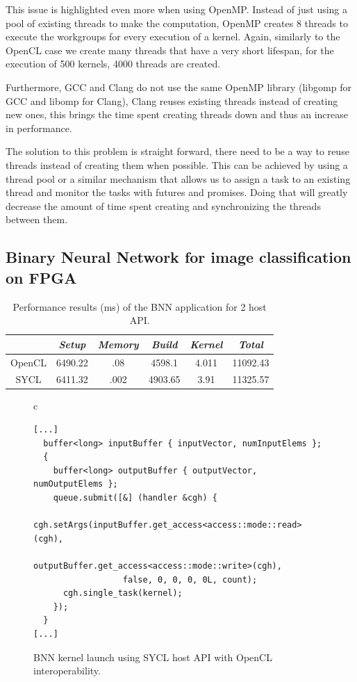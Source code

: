 \documentclass[sigplan, review, authordraft]{acmart}
\begin{document}
This issue is highlighted even more when using OpenMP. Instead of just using
a pool of existing threads to make the computation, OpenMP creates 8 threads
to execute the workgroups for every execution of a kernel. Again, similarly to
the OpenCL case we create many threads that have a very short lifespan,
for the execution of 500 kernels, 4000 threads are created.

Furthermore, GCC and Clang do not use the same OpenMP library (libgomp for GCC 
and libomp for Clang), Clang reuses existing threads instead of creating new 
ones, this brings the time spent creating threads down and thus an increase
in performance.

The solution to this problem is straight forward, there need to be a way to
reuse threads instead of creating them when possible. This can be achieved
by using a thread pool or a similar mechanism that allows us to assign a task
to an existing thread and monitor the tasks with futures and promises.
Doing that will greatly decrease the amount of time spent creating and
synchronizing the threads between them.


\subsection{Binary Neural Network for image classification on FPGA}
\label{sec:example-from-ken}

\begin{table}
  \caption{Performance results (ms) of the BNN application for 2 host
    API.}
  \begin{tabular}{|c|c|c|c|c|c|}
    \cline{2-6}
    \multicolumn{1}{c|}{}&   \textit{Setup}      & \textit{Memory} & \textit{Build}  & \textit{Kernel} & \textit{Total} \\\hline
    OpenCL& 6490.22     &     .08& 4598.1   & 4.011 &11092.43 \\\hline
    SYCL  & 6411.32     & .002   & 4903.65  & 3.91  &11325.57 \\\hline
  \end{tabular}
  \label{tbl:perfbnn}
\end{table}

\begin{figure}
  \begin{tabular}{c}
    \begin{lstlisting}[basicstyle=\scriptsize]
[...]
  buffer<long> inputBuffer { inputVector, numInputElems };
  {
    buffer<long> outputBuffer { outputVector, numOutputElems };
    queue.submit([&] (handler &cgh) {
      cgh.setArgs(inputBuffer.get_access<access::mode::read>(cgh),
                  outputBuffer.get_access<access::mode::write>(cgh),
                  false, 0, 0, 0, 0L, count);
      cgh.single_task(kernel);
    });
  }
[...]
\end{lstlisting}
\end{tabular}
\caption{BNN kernel launch using SYCL host API with OpenCL interoperability.}
\label{fig:syclbnn}
\end{figure}
\end{document}
